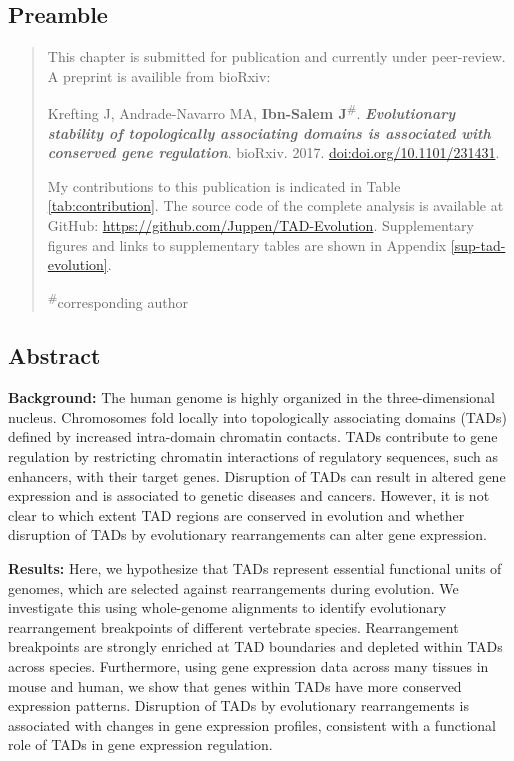\documentclass[a4paper,twoside=true,openright,parskip=full,chapterprefix=true,11pt,headings=normal,bibliography=totoc,listof=totoc,titlepage=on,captions=tableabove,draft=false]{scrreprt}
\theoremstyle{definition}
\theoremstyle{definition}
\theoremstyle{definition}
\theoremstyle{remark}
\begin{document}
\hypertarget{preamble-1}{%
\subsection*{Preamble}\label{preamble-1}}

\begin{quote}
This chapter is submitted for publication and currently under
peer-review. A preprint is availible from bioRxiv:

Krefting J, Andrade-Navarro MA, \textbf{Ibn-Salem
J}\textsuperscript{\#}. \textbf{\emph{Evolutionary stability of
topologically associating domains is associated with conserved gene
regulation}}. bioRxiv. 2017.
\href{https://doi.org/10.1101/231431}{doi:doi.org/10.1101/231431}.

My contributions to this publication is indicated in Table
\ref{tab:contribution}. The source code of the complete analysis is
available at GitHub: \url{https://github.com/Juppen/TAD-Evolution}.
Supplementary figures and links to supplementary tables are shown in
Appendix \ref{sup-tad-evolution}.

\textsuperscript{\#}corresponding author
\end{quote}

\hypertarget{abstract-2}{%
\subsection*{Abstract}\label{abstract-2}}

\textbf{Background:} The human genome is highly organized in the
three-dimensional nucleus. Chromosomes fold locally into topologically
associating domains (TADs) defined by increased intra-domain chromatin
contacts. TADs contribute to gene regulation by restricting chromatin
interactions of regulatory sequences, such as enhancers, with their
target genes. Disruption of TADs can result in altered gene expression
and is associated to genetic diseases and cancers. However, it is not
clear to which extent TAD regions are conserved in evolution and whether
disruption of TADs by evolutionary rearrangements can alter gene
expression.

\textbf{Results:} Here, we hypothesize that TADs represent essential
functional units of genomes, which are selected against rearrangements
during evolution. We investigate this using whole-genome alignments to
identify evolutionary rearrangement breakpoints of different vertebrate
species. Rearrangement breakpoints are strongly enriched at TAD
boundaries and depleted within TADs across species. Furthermore, using
gene expression data across many tissues in mouse and human, we show
that genes within TADs have more conserved expression patterns.
Disruption of TADs by evolutionary rearrangements is associated with
changes in gene expression profiles, consistent with a functional role
of TADs in gene expression regulation.
\end{document}
